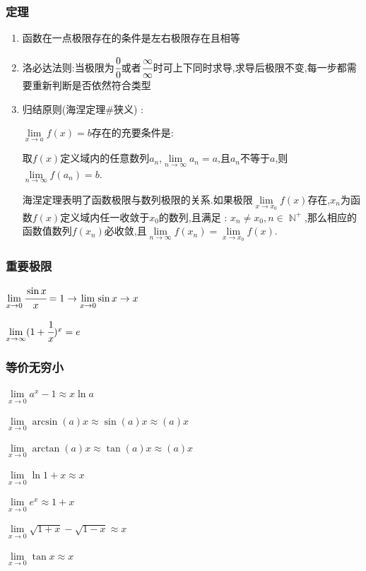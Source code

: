 \documentclass[UTF8,12pt]{ctexbook}
\newcommand{\limNormal}[1]{\lim\limits_{#1}}
\newcommand{\myLimToZero}{\limNormal{x \to 0}}
\newcommand{\myLimToInf}{\limNormal{x \to \infty}}
\newcommand{\defFunction}[1]{f(#1)}
\DeclareMathOperator{\mathNatureNumberCollection}{\mathbb{N}}
\begin{document}
{{{  \subsubsection{定理}{
    \begin{enumerate}
      \item 函数在一点极限存在的条件是左右极限存在且相等
      \item 洛必达法则:当极限为$\cfrac{0}{0}$或者$\cfrac{\infty}{\infty}$时可上下同时求导,求导后极限不变,每一步都需要重新判断是否依然符合类型
      \item {
            归结原则(海涅定理\#狭义) :

            $\limNormal{x \to a}\defFunction{x} = b$存在的充要条件是:

            取$\defFunction{x}$定义域内的任意数列${a_n}$,$\limNormal{n \to \infty}a_n = a$,且$a_n$不等于$a$,则$\limNormal{n \to \infty}\defFunction{a_n} = b$.

            海涅定理表明了函数极限与数列极限的关系.如果极限$\limNormal{x \to x_0}\defFunction{x}$存在,${x_n}$为函数$\defFunction{x}$定义域内任一收敛于$x_0$的数列,且满足 : $x_n \neq x_0,n \in \mathNatureNumberCollection^+$,那么相应的函数值数列${\defFunction{x_n}}$必收敛,且$\limNormal{n \to \infty}\defFunction{x_n} = \limNormal{x \to x_0}\defFunction{x}$.
            }
    \end{enumerate}
  }%

  \subsubsection{重要极限}{
    $\myLimToZero\cfrac{\sin{x}}{x}=1 \to \limNormal{x \to 0}\sin{x} \to x$

    $\myLimToInf(1+\cfrac{1}{x})^x = e$
  }%

  \subsubsection{等价无穷小}{
    $\myLimToZero a^x - 1 \approx x\ln{a}$

    $\myLimToZero \arcsin(a)x \approx \sin(a)x \approx (a)x$

    $\myLimToZero \arctan(a)x \approx \tan(a)x \approx (a)x$

    $\myLimToZero \ln1+x \approx x$

    $\myLimToZero e^x \approx 1+x$

    $\myLimToZero \sqrt{1 + x} - \sqrt{1 - x} \approx x$

    $\myLimToZero \tan{x} \approx x$

}}}}
\end{document}
